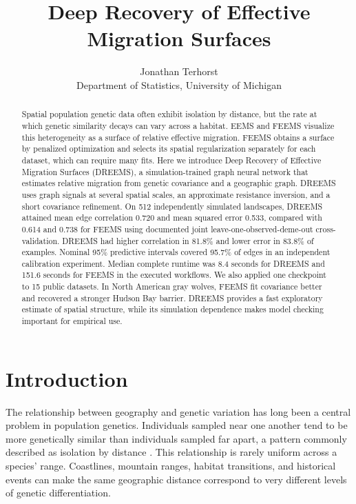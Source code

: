 \documentclass[11pt]{article}
\title{Deep Recovery of Effective Migration Surfaces}
\author{Jonathan Terhorst\\
Department of Statistics, University of Michigan}
\date{}
\newcommand{\dreems}{DREEMS\xspace}
\newcommand{\feems}{FEEMS\xspace}
\begin{document}
\maketitle

\begin{abstract}
Spatial population genetic data often exhibit isolation by distance, but the
rate at which genetic similarity decays can vary across a habitat. EEMS and
\feems visualize this heterogeneity as a surface of relative effective
migration. \feems obtains a surface by penalized optimization and selects its
spatial regularization separately for each dataset, which can require many
fits. Here we introduce Deep Recovery of Effective Migration
Surfaces (\dreems), a simulation-trained graph neural network that estimates
relative migration from genetic covariance and a geographic graph. \dreems
uses graph signals at several spatial scales, an approximate resistance
inversion, and a short covariance refinement. On 512 independently simulated
landscapes, \dreems attained mean edge correlation 0.720 and mean squared
error 0.533, compared with 0.614 and 0.738 for \feems using documented joint
leave-one-observed-deme-out cross-validation. \dreems had higher correlation in 81.8\%
and lower error in 83.8\% of examples. Nominal 95\% predictive intervals
covered 95.7\% of edges in an independent calibration experiment. Median
complete runtime was 8.4 seconds for \dreems and 151.6 seconds for \feems in
the executed workflows. We also applied one checkpoint to 15 public datasets.
In North American gray wolves, \feems fit covariance better and recovered a
stronger Hudson Bay barrier.
\dreems provides a fast exploratory estimate of spatial structure, while its
simulation dependence makes model checking important for empirical use.
\end{abstract}

\section{Introduction}

The relationship between geography and genetic variation has long been a
central problem in population genetics. Individuals sampled near one another
tend to be more genetically similar than individuals sampled far apart, a
pattern commonly described as isolation by distance
\citep{wright1943isolation,rousset1997differentiation}. This relationship is
rarely uniform across a species' range. Coastlines, mountain ranges, habitat
transitions, and historical events can make the same geographic distance
correspond to very different levels of genetic differentiation.
\end{document}
